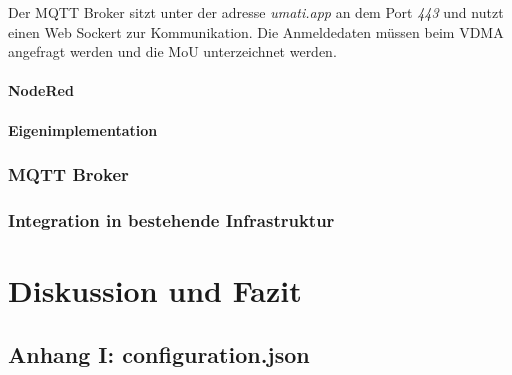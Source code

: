 \documentclass[a4paper, 12pt, oneside]{scrbook}
\begin{document}
			Der MQTT Broker sitzt unter der adresse \textit{umati.app} an dem Port \textit{443} und nutzt einen Web Sockert zur Kommunikation. Die Anmeldedaten müssen beim VDMA angefragt werden und die \ac{MoU} unterzeichnet werden.
			
			\subsubsection{NodeRed}
			
			
			\subsubsection{Eigenimplementation}
			
			
		
		\subsection{MQTT Broker}
			
			
			
			
		
		\subsection{Integration in bestehende Infrastruktur}
			

	
	
	\chapter{Diskussion und Fazit}\label{ch:Diskussion_Fazit}
	
	
	
	
	\frontmatter
	\printbibliography
	
	\pagebreak
	\section*{Anhang I: configuration.json} \label{Anhang1} %
	
	\pagebreak
\end{document}
